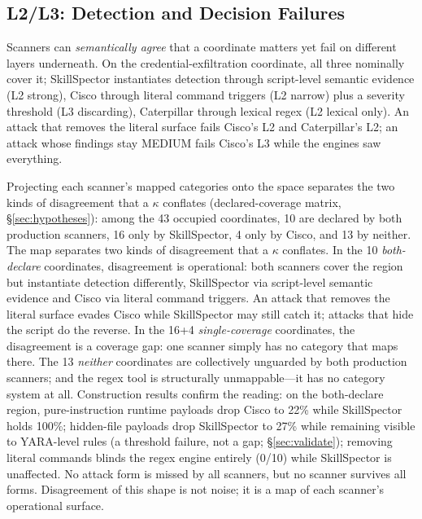 \documentclass[sigconf,nonacm]{acmart}
\begin{document}
\subsection{L2/L3: Detection and Decision Failures}
Scanners can \emph{semantically agree} that a coordinate matters yet fail on different layers underneath. On the credential-exfiltration coordinate, all three nominally cover it; SkillSpector instantiates detection through script-level semantic evidence (L2 strong), Cisco through literal command triggers (L2 narrow) plus a severity threshold (L3 discarding), Caterpillar through lexical regex (L2 lexical only). An attack that removes the literal surface fails Cisco's L2 and Caterpillar's L2; an attack whose findings stay MEDIUM fails Cisco's L3 while the engines saw everything.

Projecting each scanner's mapped categories onto the space separates the two kinds of disagreement that a $\kappa$ conflates (declared-coverage matrix, \S\ref{sec:hypotheses}): among the 43 occupied coordinates, 10 are declared by both production scanners, 16 only by SkillSpector, 4 only by Cisco, and 13 by neither. The map separates two kinds of disagreement that a $\kappa$ conflates. In the 10 \emph{both-declare} coordinates, disagreement is operational: both scanners cover the region but instantiate detection differently, SkillSpector via script-level semantic evidence and Cisco via literal command triggers. An attack that removes the literal surface evades Cisco while SkillSpector may still catch it; attacks that hide the script do the reverse. In the 16+4 \emph{single-coverage} coordinates, the disagreement is a coverage gap: one scanner simply has no category that maps there. The 13 \emph{neither} coordinates are collectively unguarded by both production scanners; and the regex tool is structurally unmappable---it has no category system at all. Construction results confirm the reading: on the both-declare region, pure-instruction runtime payloads drop Cisco to 22\% while SkillSpector holds 100\%; hidden-file payloads drop SkillSpector to 27\% while remaining visible to YARA-level rules (a threshold failure, not a gap; \S\ref{sec:validate}); removing literal commands blinds the regex engine entirely (0/10) while SkillSpector is unaffected. No attack form is missed by all scanners, but no scanner survives all forms. Disagreement of this shape is not noise; it is a map of each scanner's operational surface.
\end{document}
